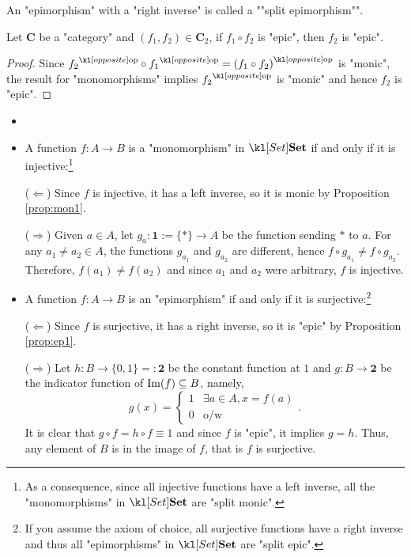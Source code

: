\documentclass[main.tex]{subfiles}
\begin{document}
\AP An "epimorphism" with a "right inverse" is called a ""split epimorphism"".
\begin{prop}
	Let $\mathbf{C}$ be a "category" and $(f_1, f_2) \in \mathbf{C}_2$, if $f_1 \circ f_2$ is "epic", then $f_2$ is "epic".
\end{prop}
\begin{proof}
	Since $\op{f_2} \circ \op{f_1} = \op{(f_1 \circ f_2)}$ is "monic", the result for "monomorphisms" implies $\op{f_2}$ is "monic" and hence $f_2$ is "epic".
\end{proof}
\begin{exmp}[$\catSet$]
	\begin{itemize}
		\item[]
		\item A function $f:A\rightarrow B$ is a "monomorphism" in $\catSet$ if and only if it is injective:\footnote{As a consequence, since all injective functions have a left inverse, all the "monomorphisms" in $\catSet$ are "split monic".}
		
		($\Leftarrow$) Since $f$ is injective, it has a left inverse, so it is monic by Proposition \ref{prop:mon1}.
		
		($\Rightarrow$) Given $a \in A$, let $g_a: \mathbf{1}:=\{\ast\} \rightarrow A$ be the function sending $\ast$ to $a$. For any $a_1 \neq a_2 \in A$, the functions $g_{a_1}$ and $g_{a_2}$ are different, hence $f \circ g_{a_1} \neq f \circ g_{a_2}$. Therefore, $f(a_1) \neq f(a_2)$ and since $a_1$ and $a_2$ were arbitrary, $f$ is injective.
		
		\item A function $f:A\rightarrow B$ is an "epimorphism" if and only if it is surjective:\footnote{If you assume the axiom of choice, all surjective functions have a right inverse and thus all "epimorphisms" in $\catSet$ are "split epic".}
		
		($\Leftarrow$) Since $f$ is surjective, it has a right inverse, so it is "epic" by Proposition \ref{prop:ep1}.
		
		($\Rightarrow$) Let $h: B \rightarrow \{0,1\}=:\mathbf{2}$ be the constant function at $1$ and $g:B \rightarrow \mathbf{2}$ be the indicator function of $\operatorname{Im}(f) \subseteq B$, namely, \[g(x) = \begin{cases}1&\exists a \in A, x = f(a)\\0&\text{o/w}\end{cases}.\]
		It is clear that $g \circ f = h\circ f \equiv 1$ and since $f$ is "epic", it implies $g = h$. Thus, any element of $B$ is in the image of $f$, that is $f$ is surjective.
	\end{itemize}
\end{exmp}
\end{document}
